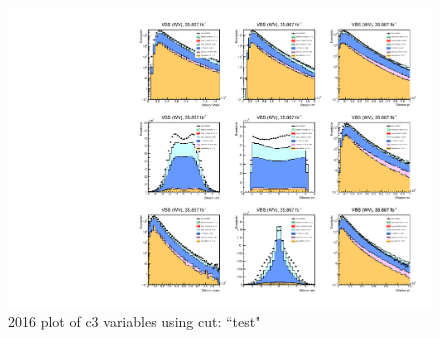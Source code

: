 \documentclass{article}
\begin{document}
            \begin{figure}[H]
                \centering
                \caption{2016 plot of c3 variables using cut: ``test"}
                \includegraphics[width=\textwidth]{2016/c3_2016_test.pdf}
            \end{figure}
\end{document}
